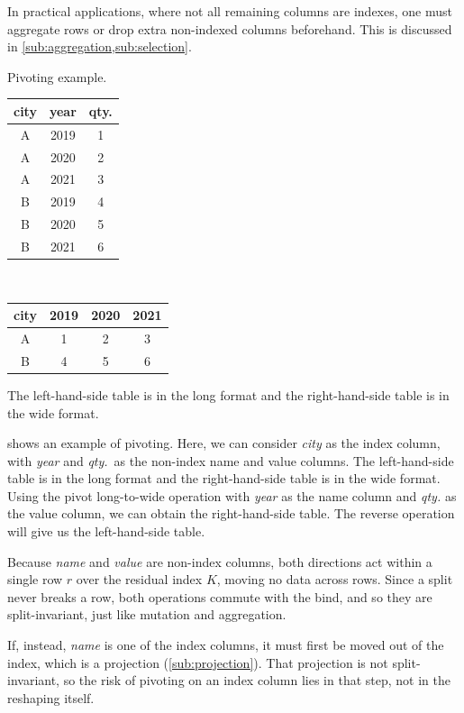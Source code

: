 In practical applications, where not all remaining columns are indexes, one must aggregate
rows or drop extra non-indexed columns beforehand.  This is discussed in
\cref{sub:aggregation,sub:selection}.

\begin{tablebox}[label=tab:pivot]{Pivoting example.}
    \centering
    \begin{tabular}{c|cc}
      \toprule
      \textbf{city} & \textbf{year} & \textbf{qty.} \\
      \midrule
      A & 2019 & 1 \\
      A & 2020 & 2 \\
      A & 2021 & 3 \\
      B & 2019 & 4 \\
      B & 2020 & 5 \\
      B & 2021 & 6 \\
      \bottomrule
    \end{tabular}
    ~
    \begin{tabular}{c|ccc}
      \toprule
      \textbf{city} & \textbf{2019} & \textbf{2020} & \textbf{2021} \\
      \midrule
      A & 1 & 2 & 3 \\
      B & 4 & 5 & 6 \\
      \bottomrule
    \end{tabular}
  \tcblower
  The left-hand-side table is in the long format and the right-hand-side table is in the
  wide format.
\end{tablebox}

 shows an example of pivoting.  Here, we can consider \emph{city} as
the index column, with \emph{year} and \emph{qty.}\ as the non-index name and value
columns.  The left-hand-side table is in the long format and the
right-hand-side table is in the wide format.  Using the pivot long-to-wide operation with
\emph{year} as the name column and \emph{qty.} as the value column, we can obtain the
right-hand-side table.  The reverse operation will give us the left-hand-side table.

Because \emph{name} and \emph{value} are non-index columns, both directions act
within a single row $r$ over the residual index $K$, moving no data across rows.
Since a split never breaks a row, both operations commute with the bind, and so
they are split-invariant, just like mutation and aggregation.

If, instead, \emph{name} is one of the index columns, it must first be moved out
of the index, which is a projection (\cref{sub:projection}).  That projection is
not split-invariant, so the risk of pivoting on an index column lies in that
step, not in the reshaping itself.

